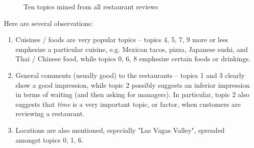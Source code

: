 \documentclass[11pt]{article}
\begin{document}
\begin{figure}[htp!]
  \caption{Ten topics mined from all restaurant reviews}
  \label{fig:all_topics}
\end{figure}


Here are several observations:
\begin{enumerate}
  \item Cuisines / foods are very popular topics -- topics 4, 5, 7, 9 more or less emphesize a particular cuisine, e.g. Mexican tacos, pizza, Japanese sushi, and Thai / Chinese food, while topics 0, 6, 8 emphesize certain foods or drinkings.
  \item General comments (usually good) to the restaurants -- topics 1 and 3 clearly show a good impression, while topic 2 possibly suggests an inferior impression in terms of waiting (and then asking for managers). In particular, topic 2 also suggests that \emph{time} is a very important topic, or factor, when customers are reviewing a restaurant.
  \item Locations are also mentioned, especially "Las Vagas Valley", spreaded amongst topics 0, 1, 6.
\end{enumerate}
\end{document}
